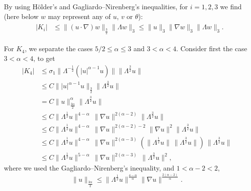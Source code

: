 \documentclass[a4paper]{article}
\begin{document}
By using H\"older's and Gagliardo--Nirenberg's inequalities, for
$i=1,2,3$ we find (here below $w$ may represent any of $u$, $v$ or $\theta$):
%
\begin{align} \label{K_i} &\begin{aligned} |K_i|&\leq \|(u \cdot
    \nabla) w \|_{\frac{3}{2}}\|\Lambda w\|_{3} \leq \|u\|_3 \|\nabla
    w\|_3 \|\Lambda w\|_{3}.
  \end{aligned}
\end{align}

For $K_4$, we separate the cases {$5/2 \leq \alpha \le 3$ and  $3 < \alpha <4$}.  
%
Consider first the case {$3 < \alpha <4$}, to get
%
  \begin{equation*} \label{K_4.ii}
    \begin{aligned}
      |K_4|&\leq \sigma_1 \|\Lambda^{-\frac{1}{2}}(|u|^{\alpha-1}u)\|
      \|\Lambda^{\frac{3}{2}}u\|
      \\
      &\leq C \||u|^{\alpha-1}u\|_{\frac{3}{2}}
      \|\Lambda^{\frac{3}{2}}u\|
      \\
      & =
      C\|u\|_{\frac{3\alpha}{2}}^{\alpha}\|\Lambda^{\frac{3}{2}}u\|
      \\
            & {\leq C\|\Lambda^\frac12 u\|^{4-\alpha}\, \|\nabla
        u\|^{2(\alpha-2)} \|\Lambda^\frac32 u\|}
      \\
      & {\leq C\|\Lambda^\frac12 u\|^{4-\alpha}\, \|\nabla
        u\|^{2(\alpha-2)-2}\|\nabla u\|^2 \|\Lambda^\frac32 u\|}
      \\
      & {\leq C\|\Lambda^\frac12 u\|^{4-\alpha}\, \|\nabla
        u\|^{2(\alpha-3)}(\|\Lambda^{\frac12} u\|\, \|\Lambda^{\frac32}
        u\|)\,\|\Lambda^\frac32 u\|}
      \\
      & { \leq C\|\Lambda^\frac12 u\|^{5-\alpha}\, \|\nabla
        u\|^{2(\alpha-3)} \,\|\Lambda^\frac32 u\|^2},
    \end{aligned}
  \end{equation*}
 where we used the Gagliardo--Nirenberg's inequality, {and $1<\alpha -2 <2$},
%
\begin{equation*}
  \|u\|_{\frac{3\alpha}{2}}\leq \|\Lambda^{\frac{1}{2}} u\|^\frac{4-\alpha}{\alpha}
  \|\nabla u\|^{\frac{2(\alpha-2)}{\alpha}}. 
\end{equation*}

\smallskip
\end{document}
